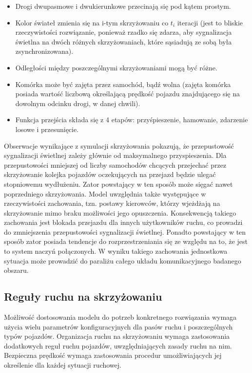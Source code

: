 \documentclass{sprawozdanie-agh}
\begin{document}
	\begin{itemize}
		\item Drogi dwupasmowe i dwukierunkowe przecinają się pod kątem prostym.
		\item Kolor świateł zmienia się na i-tym skrzyżowaniu co $t_{i}$ iteracji (jest to bliskie rzeczywistości rozwiązanie, ponieważ rzadko się zdarza, aby sygnalizacja świetlna na dwóch różnych skrzyżowaniach, które sąsiadują ze sobą była zsynchronizowana).
		\item Odległości między poszczególnymi skrzyżowaniami mogą być różne.
		\item Komórka może być zajęta przez samochód, bądź wolna (zajęta komórka posiada wartość liczbową określającą prędkość pojazdu znajdującego się na dowolnym odcinku drogi, w danej chwili).
		\item Funkcja przejścia składa się z 4 etapów: przyśpieszenie, hamowanie, zdarzenie losowe i przesunięcie.
	\end{itemize}

	Obserwacje wynikające z symulacji skrzyżowania pokazują, że przepustowość sygnalizacji świetlnej zależy głównie od maksymalnego przyspieszenia. Dla przepustowości mniejszej od liczby samochodów chcących przejechać przez skrzyżowanie kolejka pojazdów oczekujących na przejazd będzie ulegać stopniowemu wydłużeniu. Zator powstający w ten sposób może sięgać nawet poprzedniego skrzyżowania. Model uwzględnia także występujące w rzeczywistości zachowania, tzn. postawy kierowców, którzy wjeżdżają na skrzyżowanie mimo braku możliwości jego opuszczenia. Konsekwencją takiego zachowania jest blokada przejazdu dla innych użytkowników ruchu, co prowadzi do zmniejszenia przepustowości sygnalizacji świetlnej. Ponadto powstający w ten sposób zator posiada tendencje do rozprzestrzeniania się ze względu na to, że jest to system naczyń połączonych. W wyniku takiego zachowania jednostkowa sytuacja może prowadzić do paraliżu całego układu komunikacyjnego badanego obszaru.

	\subsection{Reguły ruchu na skrzyżowaniu}

	Możliwość dostosowania modelu do potrzeb konkretnego rozwiązania wymaga użycia wielu parametrów konfiguracyjnych dla pasów ruchu i poszczególnych typów pojazdów. Organizacja ruchu na skrzyżowaniu wymaga zastosowania dodatkowych reguł ruchu pojazdów, uwzględniających zasady ruchu na nim. Bezpieczna prędkość wymaga zastosowania procedur umożliwiających jej określenie dla każdej sytuacji ruchowej.
\end{document}
